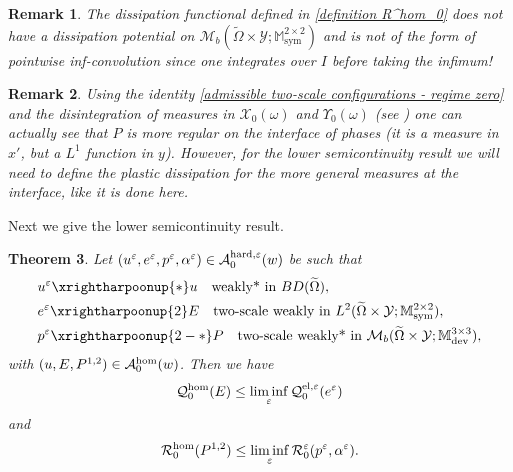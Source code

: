 \documentclass[reqno,10pt]{amsart}
\numberwithin{equation}{section}
\newtheorem{theorem}{Theorem}[section]
\newtheorem{remark}[theorem]{Remark}
\theoremstyle{remark}
\newcommand{\RED}{\color{black}}
\newcommand{\BLACK}{\color{black}}
\newcommand{\calA}{\mathcal{A}}
\newcommand{\M}{\mathbb{M}}
\newcommand{\calQ}{\mathcal{Q}}
\newcommand{\calR}{\mathcal{R}}
\newcommand{\calY}{\mathcal{Y}}
\DeclareMathOperator{\dev}{dev}
\DeclareMathOperator{\sym}{sym}
\newcommand{\weakstar}{\xrightharpoonup{*}}
\newcommand{\weaktwoscale}{\xrightharpoonup{2}}
\newcommand{\weakstartwoscale}{\xrightharpoonup{2-*}}
\newcommand{\eps}{\varepsilon}
\newcommand{\Mb}{\mathcal{M}_b}
\newcommand{\calXzero}[1]{\mathcal{X}_0({#1})}
\newcommand{\calYzero}[1]{\Upsilon_0({#1})}
\newcommand{\ext}[1]{\widetilde{#1}}
\begin{document}
\begin{remark} \label{remark interface potential}
The dissipation functional defined in \eqref{definition R^hom_0} {\RED does not\BLACK} have {\RED a\BLACK} dissipation potential on $\Mb(\ext{\Omega} \times \calY;\M^{2 \times 2}_{\sym})$ and is not of the form of pointwise inf-convolution since one integrates over $I$ before taking the infimum!
\end{remark}

\begin{remark} \label{marinrem} 
Using the identity \eqref{admissible two-scale configurations - regime zero} and the disintegration of measures in $\calXzero\omega$ and $\calYzero\omega$ (see \cite{Buzancic.Davoli.Velcic.2024.1st}) one can actually see that $P$ is more regular on the interface of phases (it is {\RED a\BLACK} measure in $x'$, but {\RED a\BLACK} $L^1$ function in $y$). However, for the lower semicontinuity result we will need to define the plastic dissipation for the more general measures at the interface, like it is done here.
\end{remark}

Next we give {\RED the\BLACK} lower semicontinuity result. 
\begin{theorem} \label{lower semicontinuity of energies - eps to 0}
Let $(u^\eps, e^\eps, p^\eps, \alpha^\eps) \in \calA_{0}^{\rm hard,\eps}(w)$ be such that
\begin{align}
	& u^\eps \weakstar u \quad \text{weakly* in $BD(\ext{\Omega})$},\\
	& e^\eps \weaktwoscale E \quad \text{two-scale weakly in $L^2(\ext{\Omega} \times \calY;\M^{2 \times 2}_{\sym})$}, \label{e^eps two-scale weakly}\\
	& p^\eps \weakstartwoscale P \quad \text{two-scale weakly* in $\Mb(\ext{\Omega} \times \calY;\M^{3 \times 3}_{\dev})$},
\end{align}
with $(u, E, P^{1,2}) \in \calA^{\rm hom}_{0}(w)$. 
Then we have
\begin{equation} \label{lower semicontinuity Eeps}
	\calQ^{\rm hom}_{0}(E) \leq \liminf\limits_{\eps} \calQ^{\rm el,\eps}_{0}(e^\eps) 
\end{equation}
and
\begin{equation} \label{lower semicontinuity Reps}
	\calR^{\rm hom}_{0}(P^{1,2}) \leq \liminf\limits_{\eps} \calR^{\eps}_{0}(p^\eps, \alpha^\eps).
\end{equation}
\end{theorem}
\end{document}
